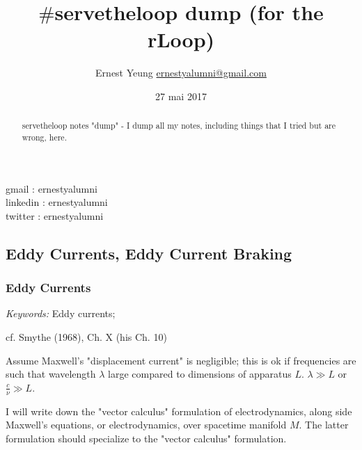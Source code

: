 \documentclass[10pt]{amsart}
\title{%
  \large $\#$servetheloop dump (for the rLoop) }
\author{Ernest Yeung \href{mailto:ernestyalumni@gmail.com}{ernestyalumni@gmail.com}}
\date{27 mai 2017}
\begin{document}

\maketitle


\noindent gmail        : ernestyalumni \\
linkedin     : ernestyalumni \\
twitter      : ernestyalumni \\

\setcounter{tocdepth}{1}
\tableofcontents


\begin{multicols*}{2}

  



\begin{abstract}
servetheloop notes "dump" - I dump all my notes, including things that I tried but are wrong, here.  

\end{abstract}

\part{Eddy Currents, Eddy Current Braking}

\section{Eddy Currents}

\emph{Keywords:} Eddy currents;

cf. Smythe (1968), Ch. X (his Ch. 10) \cite{Smyt1968}

Assume Maxwell's "displacement current" is negligible; this is ok if frequencies are such that wavelength $\lambda$ large compared to dimensions of apparatus $L$.  $\lambda \gg L$ or $\frac{c}{\nu} \gg L$.  

I will write down the "vector calculus" formulation of electrodynamics, along side Maxwell's equations, or electrodynamics, over spacetime manifold $M$.  The latter formulation should specialize to the "vector calculus" formulation.  


\end{multicols*}
\end{document}
